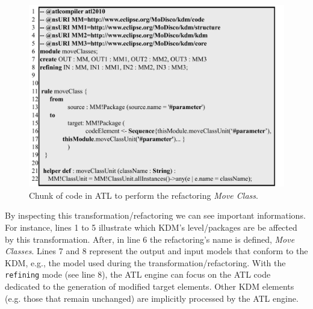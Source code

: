 
\begin{figure}[h]
	\centering
	\includegraphics[scale=0.516]{figuras/primeiroATLMOveClassFormatted}
	\caption{Chunk of code in ATL to perform the refactoring \textit{Move Class}.}
	\label{fig:ATLRefactoring}
\end{figure}


By inspecting this transformation/refactoring we can see important informations. For instance, lines 1 to 5 illustrate which KDM's level/packages are be affected by this transformation.  After, in line 6 the refactoring's name is defined, \textit{Move Classes}. Lines 7 and 8 represent the output and input models that conform to the KDM, e.g., the model used during the transformation/refactoring. 
%
With the \texttt{refining} mode (see line 8), the ATL engine can focus on the ATL code dedicated to the generation of modified target elements. Other KDM elements (e.g. those that remain unchanged) are implicitly processed by the ATL engine.

